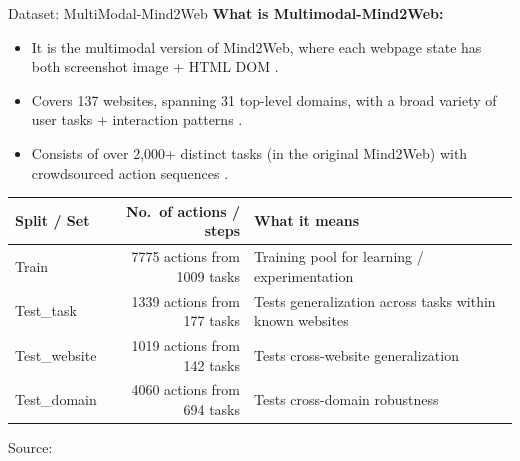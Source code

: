 \begin{frame}{Dataset: MultiModal-Mind2Web}
  \textbf{What is Multimodal-Mind2Web:}
  \begin{itemize}
    \item It is the multimodal version of Mind2Web, where each webpage state has both screenshot image + HTML DOM \cite{deng2023mind2webgeneralistagentweb}.
    \item Covers 137 websites, spanning 31 top-level domains, with a broad variety of user tasks + interaction patterns \cite{deng2023mind2webgeneralistagentweb}.
    \item Consists of over 2,000+ distinct tasks (in the original Mind2Web) with crowdsourced action sequences \cite{deng2023mind2webgeneralistagentweb}.
  \end{itemize}

  \vskip0.3cm  
  \scriptsize
  \begin{tabular}{l r l}
    \toprule
    \textbf{Split / Set} & \textbf{No.\ of actions / steps} & \textbf{What it means} \\
    \midrule
    Train         & 7775 actions from 1009 tasks & Training pool for learning / experimentation \\
    Test\_task    & 1339 actions from 177 tasks  & Tests generalization across tasks within known websites \\
    Test\_website & 1019 actions from 142 tasks  & Tests cross-website generalization \\
    Test\_domain  & 4060 actions from 694 tasks  & Tests cross-domain robustness \\
    \bottomrule
  \end{tabular}

  \vfill
  \hfill{\footnotesize Source: \cite{deng2023mind2webgeneralistagentweb}}
\end{frame}

